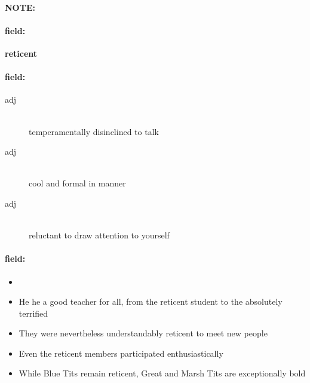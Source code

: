 \documentclass[12pt]{article}
\newenvironment{note}{\paragraph{NOTE:}}{}
\newenvironment{field}{\paragraph{field:}}{}
\begin{document}
\begin{note}
\begin{field}
\textbf{\large reticent}
\end{field}


\begin{field}
\begin{description}
\item[adj] \hfill \\ 
temperamentally disinclined to talk

\item[adj] \hfill \\ 
cool and formal in manner

\item[adj] \hfill \\ 
reluctant to draw attention to yourself

\end{description}
\end{field}

\begin{field}
\begin{itemize}
\item 
\item He he a good teacher for all, from the reticent student to the absolutely terrified
\item They were nevertheless understandably reticent to meet new people
\item Even the reticent members participated enthusiastically
\item While Blue Tits remain reticent, Great and Marsh Tits are exceptionally bold
\end{itemize}
\end{field}
\end{note}
\end{document}
